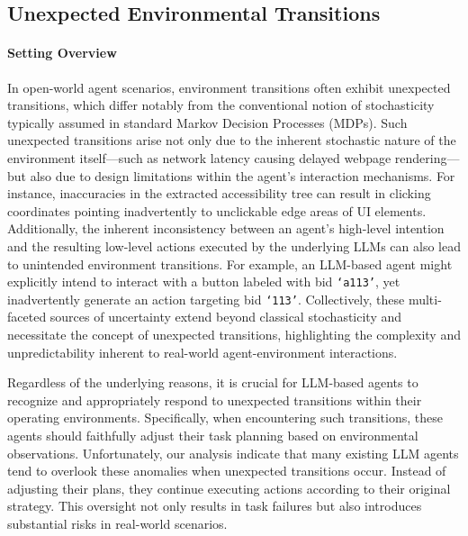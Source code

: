 
\subsection{Unexpected Environmental Transitions}

\paragraph{Setting Overview}
In open-world agent scenarios, environment transitions often exhibit unexpected transitions, which differ notably from the conventional notion of stochasticity typically assumed in standard Markov Decision Processes (MDPs). Such unexpected transitions arise not only due to the inherent stochastic nature of the environment itself---such as network latency causing delayed webpage rendering---but also due to design limitations within the agent's interaction mechanisms. For instance, inaccuracies in the extracted accessibility tree can result in clicking coordinates pointing inadvertently to unclickable edge areas of UI elements. Additionally, the inherent inconsistency between an agent's high-level intention and the resulting low-level actions executed by the underlying LLMs can also lead to unintended environment transitions. For example, an LLM-based agent might explicitly intend to interact with a button labeled with bid \texttt{`a113'}, yet inadvertently generate an action targeting bid \texttt{`113'}. Collectively, these multi-faceted sources of uncertainty extend beyond classical stochasticity and necessitate the concept of unexpected transitions, highlighting the complexity and unpredictability inherent to real-world agent-environment interactions.

Regardless of the underlying reasons, it is crucial for LLM-based agents to recognize and appropriately respond to unexpected transitions within their operating environments. Specifically, when encountering such transitions, these agents should faithfully adjust their task planning based on environmental observations. Unfortunately, our analysis indicate that many existing LLM agents tend to overlook these anomalies when unexpected transitions occur. Instead of adjusting their plans, they continue executing actions according to their original strategy. This oversight not only results in task failures but also introduces substantial risks in real-world scenarios.

